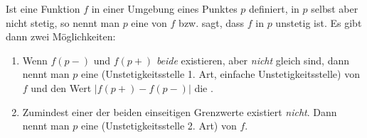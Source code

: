 Ist eine Funktion $f$ in einer Umgebung eines Punktes $p$ definiert, in $p$ selbst aber nicht stetig, so nennt man $p$ eine  von $f$ bzw. sagt, dass $f$ in $p$ unstetig ist. Es gibt dann zwei Möglichkeiten:
\begin{enumerate}
    \item Wenn $f(p-)$ und $f(p+)$ \textit{beide} existieren, aber \textit{nicht} gleich sind, dann nennt man $p$ eine  (Unstetigkeitsstelle 1. Art, einfache Unstetigkeitsstelle) von $f$ und den Wert $|f(p+) - f(p-)|$ die .
    \item Zumindest einer der beiden einseitigen Grenzwerte existiert \textit{nicht}. Dann nennt man $p$ eine  (Unstetigkeitsstelle 2. Art) von $f$.
\end{enumerate}



